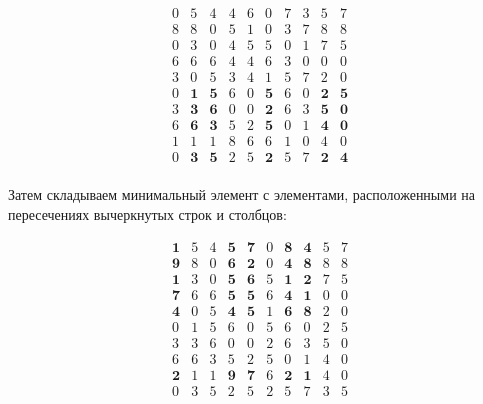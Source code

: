 \documentclass[17pt]{extarticle}
\begin{document}
\[
    \begin{array}{*{10}{c}}
        0 & 5          & 4          & 4 & 6 & 0          & 7 & 3 & 5          & 7          \\
        8 & 8          & 0          & 5 & 1 & 0          & 3 & 7 & 8          & 8          \\
        0 & 3          & 0          & 4 & 5 & 5          & 0 & 1 & 7          & 5          \\
        6 & 6          & 6          & 4 & 4 & 6          & 3 & 0 & 0          & 0          \\
        3 & 0          & 5          & 3 & 4 & 1          & 5 & 7 & 2          & 0          \\
        0 & \textbf{1} & \textbf{5} & 6 & 0 & \textbf{5} & 6 & 0 & \textbf{2} & \textbf{5} \\
        3 & \textbf{3} & \textbf{6} & 0 & 0 & \textbf{2} & 6 & 3 & \textbf{5} & \textbf{0} \\
        6 & \textbf{6} & \textbf{3} & 5 & 2 & \textbf{5} & 0 & 1 & \textbf{4} & \textbf{0} \\
        1 & 1          & 1          & 8 & 6 & 6          & 1 & 0 & 4          & 0          \\
        0 & \textbf{3} & \textbf{5} & 2 & 5 & \textbf{2} & 5 & 7 & \textbf{2} & \textbf{4} \\
    \end{array}
\]

Затем складываем минимальный элемент с элементами, расположенными на пересечениях вычеркнутых строк и столбцов:

\[
    \begin{array}{*{10}{c}}
        \textbf{1} & 5 & 4 & \textbf{5} & \textbf{7} & 0 & \textbf{8} & \textbf{4} & 5 & 7 \\
        \textbf{9} & 8 & 0 & \textbf{6} & \textbf{2} & 0 & \textbf{4} & \textbf{8} & 8 & 8 \\
        \textbf{1} & 3 & 0 & \textbf{5} & \textbf{6} & 5 & \textbf{1} & \textbf{2} & 7 & 5 \\
        \textbf{7} & 6 & 6 & \textbf{5} & \textbf{5} & 6 & \textbf{4} & \textbf{1} & 0 & 0 \\
        \textbf{4} & 0 & 5 & \textbf{4} & \textbf{5} & 1 & \textbf{6} & \textbf{8} & 2 & 0 \\
        0          & 1 & 5 & 6          & 0          & 5 & 6          & 0          & 2 & 5 \\
        3          & 3 & 6 & 0          & 0          & 2 & 6          & 3          & 5 & 0 \\
        6          & 6 & 3 & 5          & 2          & 5 & 0          & 1          & 4 & 0 \\
        \textbf{2} & 1 & 1 & \textbf{9} & \textbf{7} & 6 & \textbf{2} & \textbf{1} & 4 & 0 \\
        0          & 3 & 5 & 2          & 5          & 2 & 5          & 7          & 3 & 5 \\
    \end{array}
\]
\end{document}
